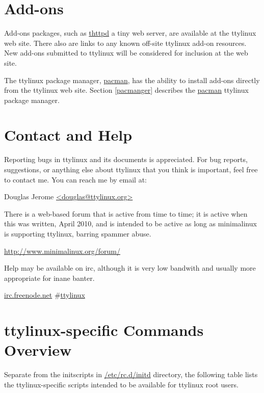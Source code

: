 \documentclass[10pt]{article}
\begin{document}
\newpage
\section{Add-ons}

Add-ons packages, such as \url{thttpd} a tiny web server, are available at the
ttylinux web site. There also are links to any known off-site ttylinux add-on
resources. New add-ons submitted to ttylinux will be considered for inclusion
at the web site.

The ttylinux package manager, \url{pacman}, has the ability to install add-ons
directly from the ttylinux web site. Section \ref{pacmanger} describes the
\url{pacman} ttylinux package manager.

\newpage
\section{Contact and Help}

Reporting bugs in ttylinux and its documents is appreciated. For bug reports,
suggestions, or anything else about ttylinux that you think is important, feel
free to contact me. You can reach me by email at:

\hspace{0.5in}Douglas Jerome \url{<douglas@ttylinux.org>}

There is a web-based forum that is active from time to time; it is active when
this was written, April 2010, and is intended to be active as long as
minimalinux is supporting ttylinux, barring spammer abuse.

\hspace{0.5in}\url{http://www.minimalinux.org/forum/}

Help may be available on irc, although it is very low bandwith and usually more
appropriate for inane banter.

\hspace{0.5in}\url{irc.freenode.net} \#\url{ttylinux}

\appendix

\newpage
\section{ttylinux-specific Commands Overview}

Separate from the initscripts in \url{/etc/rc.d/initd} directory, the
following table lists the ttylinux-specific scripts intended to be available
for ttylinux root users.
\end{document}
